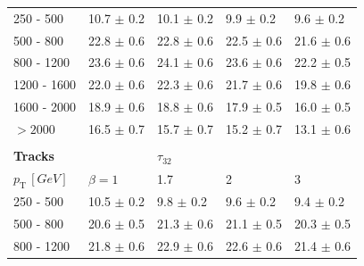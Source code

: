 \begin{table}[]
\begin{tabular}{lllll}
\multicolumn{1}{l||}{250 - 500}      & \multicolumn{1}{l|}{10.7 $\pm$ 0.2}      	& \multicolumn{1}{l|}{10.1 $\pm$ 0.2} 					& \multicolumn{1}{l|}{9.9 $\pm$ 0.2}  & \multicolumn{1}{l|}{9.6 $\pm$ 0.2}  \\
\multicolumn{1}{l||}{500 - 800}      & \multicolumn{1}{l|}{22.8 $\pm$ 0.6}      	& \multicolumn{1}{l|}{22.8 $\pm$ 0.6} & \multicolumn{1}{l|}{22.5 $\pm$ 0.6} & \multicolumn{1}{l|}{21.6 $\pm$ 0.6} \\
\multicolumn{1}{l||}{800 - 1200}     & \multicolumn{1}{l|}{23.6 $\pm$ 0.6}      					& \multicolumn{1}{l|}{24.1 $\pm$ 0.6} & \multicolumn{1}{l|}{23.6 $\pm$ 0.6} & \multicolumn{1}{l|}{22.2 $\pm$ 0.5} \\
\multicolumn{1}{l||}{1200 - 1600}    & \multicolumn{1}{l|}{22.0 $\pm$ 0.6}      					& \multicolumn{1}{l|}{22.3 $\pm$ 0.6} & \multicolumn{1}{l|}{21.7 $\pm$ 0.6} & \multicolumn{1}{l|}{19.8 $\pm$ 0.6} \\
\multicolumn{1}{l||}{1600 - 2000}    & \multicolumn{1}{l|}{18.9 $\pm$ 0.6}      	& \multicolumn{1}{l|}{18.8 $\pm$ 0.6} 					& \multicolumn{1}{l|}{17.9 $\pm$ 0.5} & \multicolumn{1}{l|}{16.0 $\pm$ 0.5} \\
\multicolumn{1}{l||}{$>2000$}        & \multicolumn{1}{l|}{16.5 $\pm$ 0.7}      	& \multicolumn{1}{l|}{15.7 $\pm$ 0.7} 					& \multicolumn{1}{l|}{15.2 $\pm$ 0.7} & \multicolumn{1}{l|}{13.1 $\pm$ 0.6} \\ \hline
                                    &                                &                           &                           &                           \\
 \multicolumn{1}{l||}{\textbf{Tracks}}         &                                & $\tau_{32}$               &                           & \multicolumn{1}{l|}{}     \\ \hline
\multicolumn{1}{l||}{$p_{\mathrm{T}} \, [GeV]$} & \multicolumn{1}{l|}{$\beta=1$} & \multicolumn{1}{l|}{1.7}  & \multicolumn{1}{l|}{2}    & \multicolumn{1}{l|}{3}    \\ \hline \hline
\multicolumn{1}{l||}{250 - 500}      & \multicolumn{1}{l|}{10.5 $\pm$ 0.2}      	& \multicolumn{1}{l|}{9.8 $\pm$ 0.2}  					& \multicolumn{1}{l|}{9.6 $\pm$ 0.2}  & \multicolumn{1}{l|}{9.4 $\pm$ 0.2}  \\
\multicolumn{1}{l||}{500 - 800}      & \multicolumn{1}{l|}{20.6 $\pm$ 0.5}      					& \multicolumn{1}{l|}{21.3 $\pm$ 0.6} & \multicolumn{1}{l|}{21.1 $\pm$ 0.5} & \multicolumn{1}{l|}{20.3 $\pm$ 0.5} \\
\multicolumn{1}{l||}{800 - 1200}     & \multicolumn{1}{l|}{21.8 $\pm$ 0.6}      					& \multicolumn{1}{l|}{22.9 $\pm$ 0.6} & \multicolumn{1}{l|}{22.6 $\pm$ 0.6} & \multicolumn{1}{l|}{21.4 $\pm$ 0.6} \\

\end{tabular}
\end{table}
